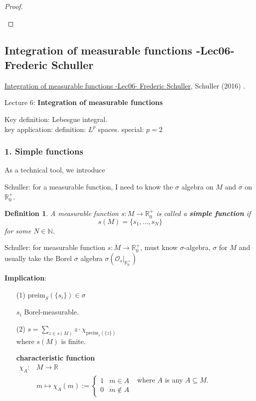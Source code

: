 \documentclass[10pt]{amsart}
\newtheorem{definition}{Definition}
\begin{document}
\begin{multicols*}{2}
\begin{proof}
\begin{enumerate}
\end{enumerate}	
\end{proof}

\subsection{Integration of measurable functions -Lec06- Frederic Schuller}

\href{https://youtu.be/ot253Lhx2_o?si=0teIskVSrMHCaoGU}{Integration of measurable functions -Lec06- Frederic Schuller}, Schuller (2016) \cite{Schu2016}.

Lecture 6: \textbf{Integration of measurable functions}

Key definition: Lebesgue integral.\\
key application: definition: $L^p$ spaces. special: $p=2$

\subsubsection{1. Simple functions}

As a technical tool, we introduce

Schuller: for a measurable function, I need to know the $\sigma$ algebra on $M$ and $\sigma$ on $\mathbb{R}_0^+$.
\begin{definition} A \emph{measurable function} $s: M \to \mathbb{R}_0^+$ is called a \textbf{simple function} if 
	\[
	s(M) = \lbrace s_1, \dots , s_N \rbrace
	\]
for some $N\in \mathbb{N}$.
\end{definition}

Schuller: for measurable function $s:M \to \mathbb{R}_0^+$, must know $\sigma$-algebra, $\sigma$ for $M$ and usually take the Borel $\sigma$ algebra $\sigma (\left. \mathcal{O}_s \right|_{\mathbb{R}_0^+} )$

\textbf{Implication}: \begin{enumerate}
	\item[(1)] $\text{preim}_S( \lbrace s_i \rbrace) \in \sigma$
	
	$s_i$ Borel-measurable.
	\item[(2)] $s = \sum_{z \in s(M)} z \cdot \chi_{\text{preim}_s(\lbrace z \rbrace) }$ \\
where $s(M)$ is finite.

\textbf{characteristic function} \\

$\begin{aligned}
	\chi_{A } : & M \to \mathbb{R} \\
	& m \mapsto \chi_A(m) := \begin{cases} 1 & m \in A \\
		0 & m \notin A \end{cases}
\end{aligned}$ where $A$ is any $A \subseteq M$. \\


\end{enumerate}
\end{multicols*}
\end{document}
